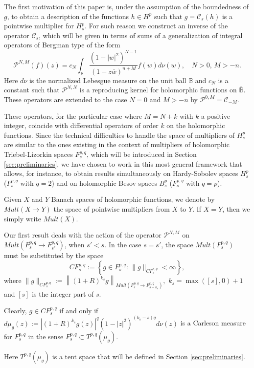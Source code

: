 \documentclass[12pt,twoside,leqno,final]{amsart}
\theoremstyle{plain}
\begin{document}
 The first motivation of this paper is, under the assumption of the boundedness of  $g$, to obtain a description of the functions $h\in H^p$ such that $g={\mathcal C}_s(h)$ is  a pointwise multiplier for $H_s^p$.
For such reason we construct an inverse of the operator ${\mathcal C}_s$, which will be given in terms of sums of a generalization of integral operators of Bergman type of the form 
$$
{{\mathcal P}}^{N,M}(f)(z)=c_N\int_{{\mathbb B}} \frac{(1-|w|^2)^{N-1}}{(1-z\overline{w})^{n+M}}f(w)d\nu(w),
\quad N>0,\,M>-n.
$$ 
Here   $d\nu$  is the normalized Lebesgue measure on the unit ball ${{\mathbb B}}$ and $c_N$ is a constant such that ${{\mathcal P}}^{N,N}$ is a reproducing kernel for holomorphic functions on $\overline{{\mathbb B}}$. These operators are extended to the case $N=0$ and $M>-n$ by ${{\mathcal P}}^{0,M}={\mathcal C}_{-M}$.

These operators, for the particular case where $M=N+k$ with $k$ a positive integer, coincide with differential operators of order $k$ on the holomorphic functions. Since the technical difficulties to handle the space of multipliers of $H_s^p$ are  similar to the ones existing in the context of multipliers of holomorphic Triebel-Lizorkin spaces $F_s^{p,q}$, which will be introduced in Section \ref{sec:preliminaries}, we have chosen to work in this most general framework that allows, for instance, to obtain results simultaneously on Hardy-Sobolev spaces $H_s^p$ ($F_s^{p,q}$ with $q=2$) and on holomorphic Besov spaces $B_s^p$ ($F_s^{p,q}$ with $q=p$).

Given  $X$ and $Y$ Banach spaces of holomorphic functions, we denote by $Mult(X\to Y)$ the space of pointwise multipliers from $X$ to $Y$. If $X=Y$, then we simply write $Mult(X)$.

Our first result deals with the action of the operator ${{\mathcal P}}^{N,M}$ on $Mult(F^{p,q}_s\to F^{p,q}_{s'})$, when $s'<s$. In the case $s=s'$, the space  $Mult(F^{p,q}_s)$  must be substituted by the space   
 $$
CF^{p,q}_s:=\left\{g\in F^{p,q}_s:\,\|g\|_{CF^{p,q}_s}<\infty\right\},
$$
where
$
\|g\|_{CF^{p,q}_s}:=\left\|(1+R)^{k_s} g\right\|_{Mult(F^{p,q}_s\to F^{p,q}_{s-k_s})},
$
$k_s=\max([s],0)+1$ and $[s]$ is the integer part of $s$.

Clearly,
$g\in CF^{p,q}_s$ if and only if $d\mu_g(z):= |(1+R)^{k_s} g(z)|^q(1-|z|^2)^{(k_s-s)q} d\nu(z)$ is a Carleson measure for $F^{p,q}_s$
 in the sense $F^{p,q}_s\subset T^{p,q}(\mu_g)$.
 
 Here $T^{p,q}(\mu_g)$ is a tent space that will be defined in Section \ref{sec:preliminaries}. 
 
\end{document}
